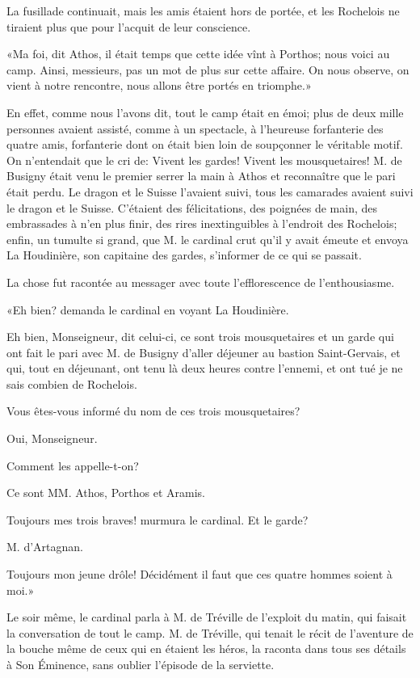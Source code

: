 La fusillade continuait, mais les amis étaient hors de portée, et les Rochelois ne tiraient plus que pour l'acquit de leur conscience. 

«Ma foi, dit Athos, il était temps que cette idée vînt à Porthos; nous voici au camp. Ainsi, messieurs, pas un mot de plus sur cette affaire. On nous observe, on vient à notre rencontre, nous allons être portés en triomphe.» 

En effet, comme nous l'avons dit, tout le camp était en émoi; plus de deux mille personnes avaient assisté, comme à un spectacle, à l'heureuse forfanterie des quatre amis, forfanterie dont on était bien loin de soupçonner le véritable motif. On n'entendait que le cri de: Vivent les gardes! Vivent les mousquetaires! M. de Busigny était venu le premier serrer la main à Athos et reconnaître que le pari était perdu. Le dragon et le Suisse l'avaient suivi, tous les camarades avaient suivi le dragon et le Suisse. C'étaient des félicitations, des poignées de main, des embrassades à n'en plus finir, des rires inextinguibles à l'endroit des Rochelois; enfin, un tumulte si grand, que M. le cardinal crut qu'il y avait émeute et envoya La Houdinière, son capitaine des gardes, s'informer de ce qui se passait. 

La chose fut racontée au messager avec toute l'efflorescence de l'enthousiasme. 

«Eh bien? demanda le cardinal en voyant La Houdinière. 

\speak  Eh bien, Monseigneur, dit celui-ci, ce sont trois mousquetaires et un garde qui ont fait le pari avec M. de Busigny d'aller déjeuner au bastion Saint-Gervais, et qui, tout en déjeunant, ont tenu là deux heures contre l'ennemi, et ont tué je ne sais combien de Rochelois. 

\speak  Vous êtes-vous informé du nom de ces trois mousquetaires? 

\speak  Oui, Monseigneur. 

\speak  Comment les appelle-t-on? 

\speak  Ce sont MM. Athos, Porthos et Aramis. 

\speak  Toujours mes trois braves! murmura le cardinal. Et le garde? 

\speak  M. d'Artagnan. 

\speak  Toujours mon jeune drôle! Décidément il faut que ces quatre hommes soient à moi.» 

Le soir même, le cardinal parla à M. de Tréville de l'exploit du matin, qui faisait la conversation de tout le camp. M. de Tréville, qui tenait le récit de l'aventure de la bouche même de ceux qui en étaient les héros, la raconta dans tous ses détails à Son Éminence, sans oublier l'épisode de la serviette. 

